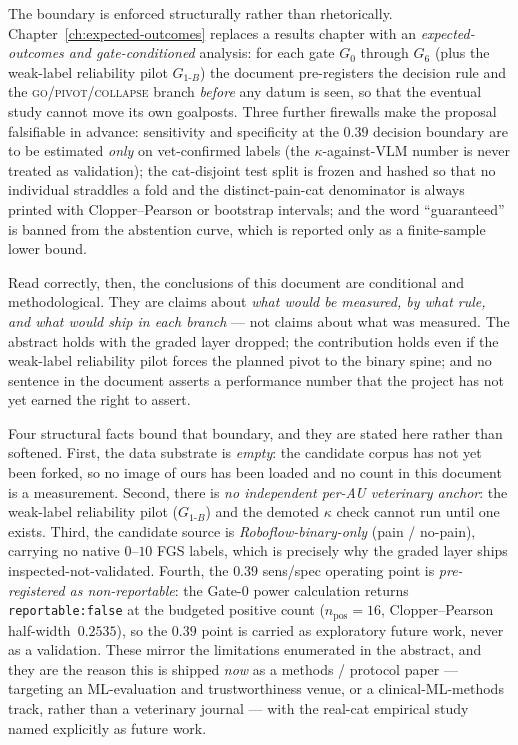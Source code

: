 The boundary is enforced structurally rather than rhetorically. Chapter~\ref{ch:expected-outcomes}
replaces a results chapter with an \emph{expected-outcomes and gate-conditioned}
analysis: for each gate $G_0$ through $G_6$ (plus the weak-label reliability pilot
$G_{1\text{-}B}$) the document pre-registers the decision rule and the
\textsc{go}/\textsc{pivot}/\textsc{collapse} branch \emph{before} any datum is
seen, so that the eventual study cannot move its own goalposts. Three further
firewalls make the proposal falsifiable in advance: sensitivity and specificity at
the $0.39$ decision boundary are to be estimated \emph{only} on vet-confirmed
labels (the $\kappa$-against-VLM number is never treated as validation); the
cat-disjoint test split is frozen and hashed so that no individual straddles a
fold and the distinct-pain-cat denominator is always printed with
Clopper--Pearson or bootstrap intervals; and the word ``guaranteed'' is banned
from the abstention curve, which is reported only as a finite-sample lower bound.

Read correctly, then, the conclusions of this document are conditional and
methodological. They are claims about \emph{what would be measured, by what rule,
and what would ship in each branch} --- not claims about what was measured. The
abstract holds with the graded layer dropped; the contribution holds even if the
weak-label reliability pilot forces the planned pivot to the binary spine; and no
sentence in the document asserts a performance number that the project has not yet
earned the right to assert.

Four structural facts bound that boundary, and they are stated here rather than
softened. First, the data substrate is \emph{empty}: the candidate corpus has not
yet been forked, so no image of ours has been loaded and no count in this document
is a measurement. Second, there is \emph{no independent per-AU veterinary anchor}:
the weak-label reliability pilot ($G_{1\text{-}B}$) and the demoted $\kappa$ check
cannot run until one exists. Third, the candidate source is
\emph{Roboflow-binary-only} (pain / no-pain), carrying no native $0$--$10$ FGS
labels, which is precisely why the graded layer ships inspected-not-validated.
Fourth, the $0.39$ sens/spec operating point is \emph{pre-registered as
non-reportable}: the Gate-0 power calculation returns
\texttt{reportable:false} at the budgeted positive count ($n_{\text{pos}}{=}16$,
Clopper--Pearson half-width~$0.2535$), so the $0.39$ point is carried as
exploratory future work, never as a validation. These mirror the limitations
enumerated in the abstract, and they are the reason this is shipped \emph{now} as a
methods / protocol paper --- targeting an ML-evaluation and trustworthiness venue,
or a clinical-ML-methods track, rather than a veterinary journal --- with the
real-cat empirical study named explicitly as future work.

